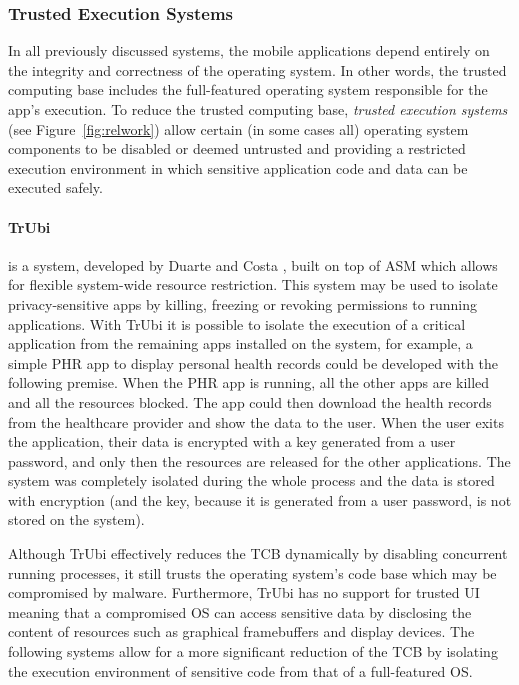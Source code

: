 \subsubsection{Trusted Execution Systems}
\label{sec:tee}

In all previously discussed systems, the mobile applications depend entirely on the integrity and correctness of the operating system. In other words, the trusted computing base includes the full-featured operating system responsible for the app's execution. To reduce the trusted computing base, \emph{trusted execution systems} (see Figure~\ref{fig:relwork}) allow certain (in some cases all) operating system components to be disabled or deemed untrusted and providing a restricted execution environment in which sensitive application code and data can be executed safely.

\paragraph{\textbf{TrUbi}} is a system, developed by Duarte \cite{nunoduarte} and Costa \cite{miguelcosta}, built on top of ASM \cite{heuser2014asm} which allows for flexible system-wide resource restriction. This system may be used to isolate privacy-sensitive apps by killing, freezing or revoking permissions to running applications. With TrUbi it is possible to isolate the execution of a critical application from the remaining apps installed on the system, for example, a simple \ac{PHR} app to display personal health records could be developed with the following premise. When the \ac{PHR} app is running, all the other apps are killed and all the resources blocked. The app could then download the health records from the healthcare provider and show the data to the user. When the user exits the application, their data is encrypted with a key generated from a user password, and only then the resources are released for the other applications. The system was completely isolated during the whole process and the data is stored with encryption (and the key, because it is generated from a user password, is not stored on the system).

Although TrUbi effectively reduces the TCB dynamically by disabling concurrent running processes, it still trusts the operating system's code base which may be compromised by malware. Furthermore, TrUbi has no support for trusted UI meaning that a compromised OS can access sensitive data by disclosing the content of resources such as graphical framebuffers and display devices. The following systems allow for a more significant reduction of the TCB by isolating the execution environment of sensitive code from that of a full-featured OS.

